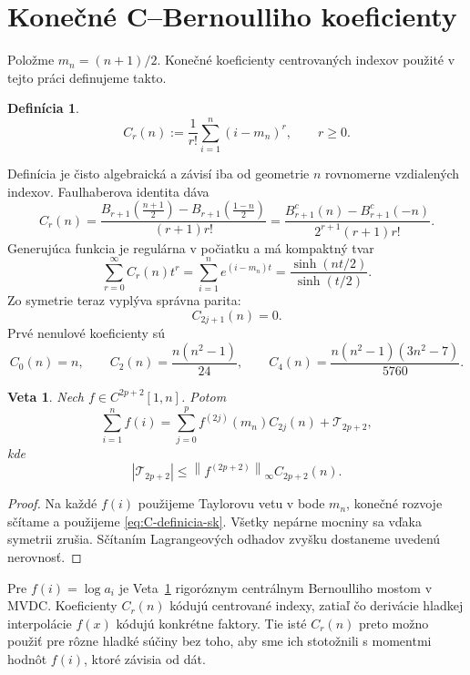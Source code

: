 \documentclass[11pt,a4paper]{article}
\newtheorem{veta}{Veta}
\newtheorem{definicia}{Definícia}
\begin{document}
\section{Konečné C--Bernoulliho koeficienty}

Položme \(m_n=(n+1)/2\). Konečné koeficienty centrovaných indexov
použité v tejto práci definujeme takto.
\begin{definicia}
\begin{equation}\label{eq:C-definicia-sk}
  \boxed{\;
  C_r(n):=\frac1{r!}\sum_{i=1}^{n}(i-m_n)^r,\qquad r\ge0.\;}
\end{equation}
\end{definicia}
Definícia je čisto algebraická a závisí iba od geometrie \(n\)
rovnomerne vzdialených indexov. Faulhaberova identita dáva
\begin{equation}\label{eq:C-bernoulli-sk}
  C_r(n)
  =
  \frac{
    B_{r+1}\!\left(\frac{n+1}{2}\right)
    -B_{r+1}\!\left(\frac{1-n}{2}\right)}
  {(r+1)r!}
  =
  \frac{B_{r+1}^c(n)-B_{r+1}^c(-n)}
  {2^{r+1}(r+1)r!}.
\end{equation}
Generujúca funkcia je regulárna v počiatku a má kompaktný tvar
\begin{equation}\label{eq:C-generujuca-sk}
  \boxed{\;
  \sum_{r=0}^{\infty}C_r(n)t^r
  =\sum_{i=1}^{n}e^{(i-m_n)t}
  =\frac{\sinh(nt/2)}{\sinh(t/2)}.\;}
\end{equation}
Zo symetrie teraz vyplýva správna parita:
\[
  C_{2j+1}(n)=0.
\]
Prvé nenulové koeficienty sú
\[
  C_0(n)=n,\qquad
  C_2(n)=\frac{n(n^2-1)}{24},\qquad
  C_4(n)=\frac{n(n^2-1)(3n^2-7)}{5760}.
\]

\begin{veta}\label{veta:stredovy-rozvoj}
Nech \(f\in C^{2p+2}[1,n]\). Potom
\begin{equation}\label{eq:stredovy-rozvoj}
  \sum_{i=1}^{n}f(i)
  =
  \sum_{j=0}^{p}f^{(2j)}(m_n)C_{2j}(n)
  +\mathcal T_{2p+2},
\end{equation}
kde
\[
  |\mathcal T_{2p+2}|
  \le
  \left\|f^{(2p+2)}\right\|_{\infty}
  C_{2p+2}(n).
\]
\end{veta}
\begin{proof}
Na každé \(f(i)\) použijeme Taylorovu vetu v bode \(m_n\), konečné
rozvoje sčítame a použijeme \eqref{eq:C-definicia-sk}. Všetky nepárne
mocniny sa vďaka symetrii zrušia. Sčítaním Lagrangeových odhadov zvyšku
dostaneme uvedenú nerovnosť.
\end{proof}

Pre \(f(i)=\log a_i\) je Veta~\ref{veta:stredovy-rozvoj} rigoróznym
centrálnym Bernoulliho mostom v MVDC. Koeficienty \(C_r(n)\) kódujú
centrované indexy, zatiaľ čo derivácie hladkej interpolácie \(f(x)\)
kódujú konkrétne faktory. Tie isté \(C_r(n)\) preto možno použiť pre
rôzne hladké súčiny bez toho, aby sme ich stotožnili s momentmi hodnôt
\(f(i)\), ktoré závisia od dát.
\end{document}

